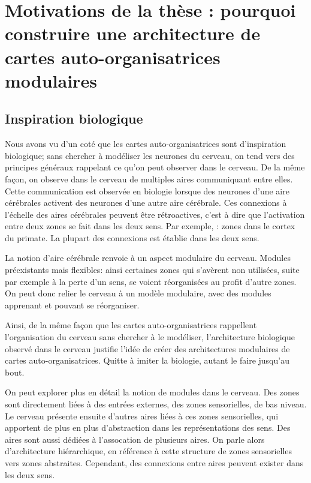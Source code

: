 \section{Motivations de la thèse : pourquoi construire une architecture de cartes auto-organisatrices modulaires}

\subsection{Inspiration biologique}
Nous avons vu d'un coté que les cartes auto-organisatrices sont d'inspiration biologique; sans chercher à modéliser les neurones du cerveau, on tend vers des principes généraux rappelant ce qu'on peut observer dans le cerveau. De la même façon, on observe dans le cerveau de multiples aires communiquant entre elles. Cette communication est observée en biologie lorsque des neurones d'une aire cérébrales activent des neurones d'une autre aire cérébrale. 
Ces connexions à l'échelle des aires cérébrales peuvent être rétroactives, c'est à dire que l'activation entre deux zones se fait dans les deux sens. Par exemple, \cite{primate_cortex_91}: zones dans le cortex du primate. La plupart des connexions est établie dans les deux sens.

La notion d'aire cérébrale renvoie à un aspect modulaire du cerveau. Modules préexistants mais flexibles: ainsi certaines zones qui s'avèrent non utilisées, suite par exemple à la perte d'un sens, se voient réorganisées au profit d'autre zones. On peut donc relier le cerveau à un modèle modulaire, avec des modules apprenant et pouvant se réorganiser.

Ainsi, de la même façon que les cartes auto-organisatrices rappellent l'organisation du cerveau sans chercher à le modéliser, l'architecture biologique observé dans le cerveau justifie l'idée de créer des architectures modulaires de cartes auto-organisatrices. Quitte à imiter la biologie, autant le faire jusqu'au bout.

On peut explorer plus en détail la notion de modules dans le cerveau. Des zones sont directement liées à des entrées externes, des zones sensorielles, de bas niveau. Le cerveau présente ensuite  d'autres aires liées à ces zones sensorielles, qui apportent de plus en plus d'abstraction dans les représentations des sens. Des aires sont aussi dédiées à l'assocation de plusieurs aires. On parle alors d'architecture hiérarchique, en référence à cette structure de zones sensorielles vers zones abstraites. Cependant, des connexions entre aires peuvent exister dans les deux sens. 

